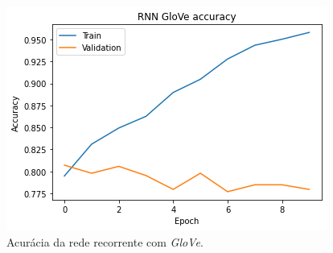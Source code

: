 \documentclass[twoside,conference,a4paper]{IEEEtran}
\begin{document}


\begin{figure}[ht]
\centering
\includegraphics[width=0.8\hsize]{figuras/rnn_acc_glove.png}
\caption{Acurácia da rede recorrente com \textit{GloVe}.}
\label{rnn:glove}
\end{figure}



\end{document}

